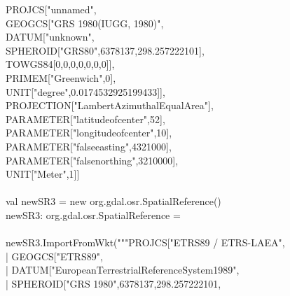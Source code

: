 \documentclass {article}
\begin{document}
PROJCS["unnamed", \\
\hspace*{2mm} GEOGCS["GRS 1980(IUGG, 1980)", \\
\hspace*{4mm} DATUM["unknown", \\
\hspace*{6mm} SPHEROID["GRS80",6378137,298.257222101],\\
\hspace*{6mm} TOWGS84[0,0,0,0,0,0,0]], \\
\hspace*{4mm} PRIMEM["Greenwich",0], \\
\hspace*{4mm} UNIT["degree",0.0174532925199433]],\\
\hspace*{2mm} PROJECTION["Lambert\underline{\space}Azimuthal\underline{\space}Equal\underline{\space}Area"],\\
\hspace*{2mm} PARAMETER["latitude\underline{\space}of\underline{\space}center",52],\\
\hspace*{2mm} PARAMETER["longitude\underline{\space}of\underline{\space}center",10],\\
\hspace*{2mm} PARAMETER["false\underline{\space}easting",4321000],\\
\hspace*{2mm} PARAMETER["false\underline{\space}northing",3210000],\\
\hspace*{2mm} UNIT["Meter",1]]\\
\\
val newSR3 = new org.gdal.osr.SpatialReference() \\
newSR3: org.gdal.osr.SpatialReference = \\
\\
newSR3.ImportFromWkt("""PROJCS["ETRS89 / ETRS-LAEA",\\
     |    \hspace*{4mm} GEOGCS["ETRS89", \\
     |    \hspace*{6mm} DATUM["European\underline{\space}Terrestrial\underline{\space}Reference\underline{\space}System\underline{\space}1989",\\
     |     \hspace*{8mm} SPHEROID["GRS 1980",6378137,298.257222101,\\
\end{document}
